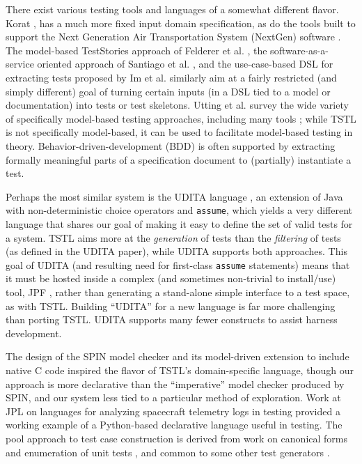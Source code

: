 There exist various testing tools and languages of a somewhat
different flavor.   Korat \cite{Korat}, has a much more fixed
input domain specification, as do the tools built to support the Next
Generation Air Transportation System (NextGen) software
\cite{TameInputs}. The model-based TestStories approach of Felderer et
al. \cite{TestStories}, the software-as-a-service oriented approach of
Santiago et al. \cite{Santiago}, and the use-case-based DSL for extracting tests
proposed by Im et al. \cite{AutoDSL} similarly aim at a fairly
restricted (and simply different) goal of turning certain inputs (in a DSL tied to a model or
documentation) into tests or test skeletons.  Utting et al. survey the wide variety of
specifically model-based testing approaches, including many tools
\cite{Taxonomy}; while TSTL is not specifically model-based, it can be
used to facilitate model-based testing in theory.
Behavior-driven-development (BDD) \cite{BDD} is often supported by extracting
formally meaningful parts of a specification document to (partially)
instantiate a test.  




Perhaps the most similar system is the UDITA language
\cite{UDITA}, an extension of Java with non-deterministic choice
operators and {\tt assume}, which yields a very different language
that shares our goal of making it easy to define the set of valid
tests for a system.  TSTL aims more at the \emph{generation} of
tests than the \emph{filtering} of tests (as defined in the UDITA
paper), while UDITA supports both approaches.  This goal of UDITA (and
resulting need for first-class {\tt assume} statements) means that it
must be hosted inside a complex (and sometimes non-trivial to
install/use) tool, JPF \cite{JPF2}, rather than generating a
stand-alone simple interface to a test space, as with TSTL.  Building
``UDITA'' for a new language is far more challenging than porting
TSTL.  UDITA supports many fewer constructs to assist harness
development.

The design of the SPIN model checker \cite{SPIN} and its model-driven
extension to include native C code \cite{ModelDriven} inspired the
flavor of TSTL's domain-specific language, though our approach is more
declarative than the ``imperative'' model checker produced by SPIN,
and our system less tied to a particular method of exploration.
Work at JPL on languages for analyzing spacecraft telemetry
logs in testing \cite{scriptstospecs} provided a working example of a
Python-based declarative language useful in testing.  The pool
approach to test case construction is derived from work on canonical
forms and enumeration of unit tests \cite{AndrewsTR}, and common to
some other test generators \cite{Pacheco}.

